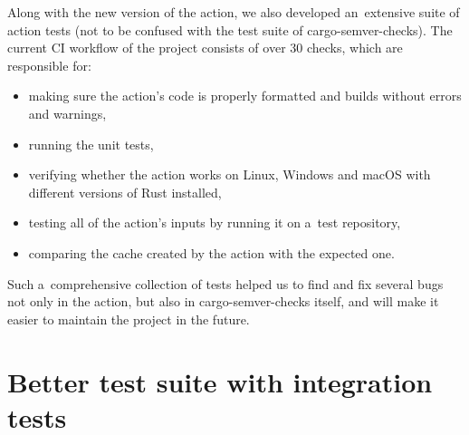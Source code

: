 \documentclass[licencjacka,en]{pracamgr}
\begin{document}
Along with the new version of the action, we also developed an~extensive suite of action tests
(not to be confused with the test suite of cargo-semver-checks). The current CI workflow
of the project consists of over 30 checks, which are responsible for:
\begin{itemize}
	\item making sure the action's code is properly formatted and builds without errors and warnings,
	\item running the unit tests,
	\item verifying whether the action works on Linux, Windows and macOS with different versions of
		Rust installed,
	\item testing all of the action's inputs by running it on a~test repository,
	\item comparing the cache created by the action with the expected one.
\end{itemize}
Such a~comprehensive collection of tests helped us to find and fix several bugs not only in the action,
but also in cargo-semver-checks itself, and will make it easier to maintain the project in the future.

\section{Better test suite with integration tests}\label{r:section_test_suite}
\end{document}
